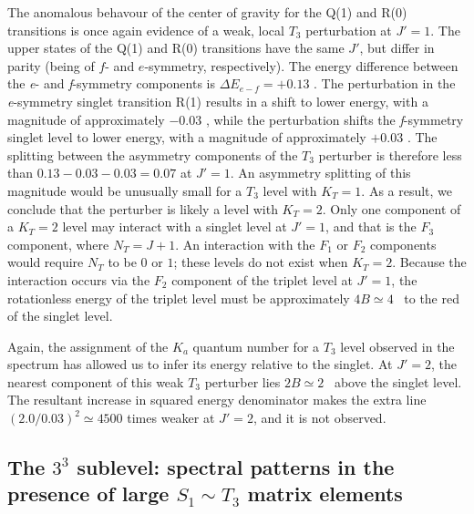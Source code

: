 \documentclass[12pt]{mitthesis}
\begin{document}
 The anomalous behavour of the center of gravity
for the Q(1) and R(0) transitions is once again evidence of a weak,
local $T_3$ perturbation at $J'=1$.  The upper states of the Q(1) and
R(0) transitions have the same $J'$, but differ in parity (being of
$f$- and $e$-symmetry, respectively).  The energy difference between
the \emph{e}- and \emph{f}-symmetry components is $\Delta
E_{e-f}=+0.13$ \rcm.  The perturbation in the \emph{e}-symmetry
singlet transition R(1) results in a shift to lower energy, with a
magnitude of approximately $-0.03$ \rcm, while the perturbation shifts the
\emph{f}-symmetry singlet level to lower energy, with a magnitude
of approximately $+0.03$ \rcm.  The splitting between the asymmetry
components of the $T_3$ perturber is therefore less than
$0.13-0.03-0.03=0.07$ \rcm at $J'=1$.  An asymmetry splitting of this
magnitude would be unusually small for a $T_3$ level with $K_T=1$.  As
a result, we conclude that the perturber is likely a level with
$K_T=2$.  Only one component of a $K_T=2$ level may interact with a
singlet level at $J'=1$, and that is the $F_3$ component, where
$N_T=J+1$.  An interaction with the $F_1$ or $F_2$ components would
require $N_T$ to be $0$ or $1$; these levels do not exist when
$K_T=2$.  Because the interaction occurs via the $F_2$ component of
the triplet level at $J'=1$, the rotationless energy of the triplet
level must be approximately $4B \simeq 4$ \rcm\ to the red of the
singlet level.

Again, the assignment of the $K_a$ quantum number for a $T_3$ level
observed in the spectrum has allowed us to infer its energy relative
to the singlet.  At $J'=2$, the nearest component of this weak $T_3$
perturber lies $2B \simeq 2$ \rcm\ above the singlet level.  The
resultant increase in squared energy denominator makes the
extra line $(2.0/0.03)^2 \simeq 4500$ times weaker at $J'=2$, and it
is not observed.

%
% 











\subsection{The $3^3$  sublevel: spectral patterns in the
  presence of large $S_1 \sim T_3$ matrix elements}
\end{document}

